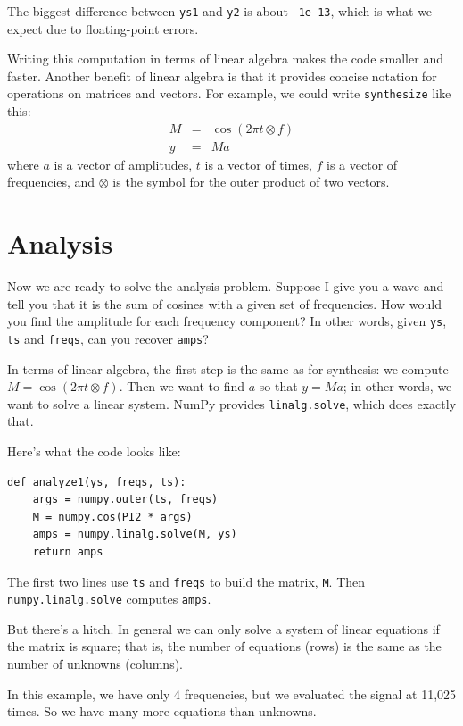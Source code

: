 \documentclass[12pt]{book}
\begin{document}
The biggest difference between {\tt ys1} and {\tt y2} is about {\tt
  1e-13}, which is what we expect due to floating-point errors.

Writing this computation in terms of linear algebra makes the code
smaller and faster.  Another benefit of linear algebra is that it
provides concise notation for operations on matrices and vectors.  For
example, we could write {\tt synthesize} like this:
%
\begin{eqnarray*}
M &=& \cos (2 \pi t \otimes f) \\
y &=& M a
\end{eqnarray*}
%
where $a$ is a vector of amplitudes,
$t$ is a vector of times, $f$ is a vector of frequencies, and
$\otimes$ is the symbol for the outer product of two vectors.


\section{Analysis}
\label{analysis}

Now we are ready to solve the analysis problem.  Suppose I give you
a wave and tell you that it is the sum of cosines with a given set
of frequencies.  How would you find the amplitude for each frequency
component?  In other words, given {\tt ys}, {\tt ts} and {\tt freqs},
can you recover {\tt amps}?

In terms of linear algebra, the first step is the same as for
synthesis: we compute $M = \cos (2 \pi t \otimes f)$.  Then we want
to find $a$ so that $y = M a$; in other words, we want to solve a
linear system.  NumPy provides {\tt linalg.solve}, which does
exactly that.

Here's what the code looks like:

\begin{verbatim}
def analyze1(ys, freqs, ts):
    args = numpy.outer(ts, freqs)
    M = numpy.cos(PI2 * args)
    amps = numpy.linalg.solve(M, ys)
    return amps
\end{verbatim}

The first two lines use {\tt ts} and {\tt freqs} to build the
matrix, {\tt M}.  Then {\tt numpy.linalg.solve} computes {\tt amps}.

But there's a hitch.  In general we can only solve a system of linear
equations if the matrix is square; that is, the number of equations
(rows) is the same as the number of unknowns (columns).

In this example, we have only 4 frequencies, but we evaluated the
signal at 11,025 times.  So we have many more equations than unknowns.
\end{document}
